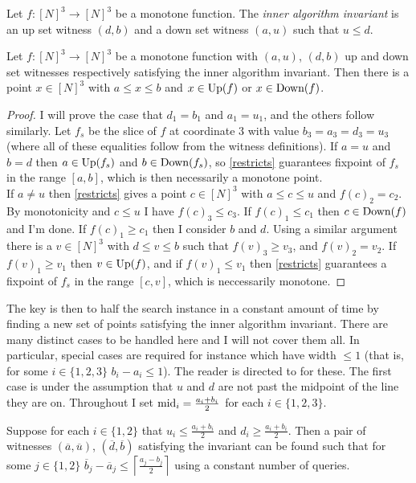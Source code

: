 \begin{definition}
  Let $f : [N]^3 \to [N]^3$ be a monotone function. The \emph{inner algorithm invariant}
  is an up set witness $(d, b)$ and a down set witness $(a, u)$ such that $u \leq d$.
\end{definition}
\begin{lemma}
  Let $f : [N]^3 \to [N]^3$ be a monotone function with $(a, u)$, $(d, b)$ up
  and down set witnesses respectively satisfying the inner algorithm invariant.
  Then there is a point $x \in [N]^3$ with $a \leq x \leq b$ and $x \in \text{Up}(f)$ or $x \in \text{Down}(f)$.
\end{lemma}
\begin{proof}
  I will prove the case that $d_1 = b_1$ and $a_1 = u_1$, and the others follow similarly.
  Let $f_s$ be the slice of $f$ at coordinate $3$ with value $b_3 = a_3 = d_3 = u_3$ (where all of
  these equalities follow from the witness definitions). If $a = u$ and $b = d$ then $a \in \text{Up}(f_s)$ and
  $b \in \text{Down}(f_s)$, so \cref{restricts} guarantees fixpoint of $f_s$ in the range $[a, b]$, which is then
  necessarily a monotone point. \\
  If $a \neq u$ then \cref{restricts} gives a point $c \in [N]^3$ with $a \leq c \leq u$ and $f(c)_2 = c_2$.
  By monotonicity and $c \leq u$ I have $f(c)_3 \leq c_3$. If $f(c)_1 \leq c_1$ then $c \in \text{Down}(f)$ and I'm done.
  If $f(c)_1 \geq c_1$ then I consider $b$ and $d$. Using a similar argument there is a $v \in [N]^3$ with $d \leq v \leq b$
  such that $f(v)_3 \geq v_3$, and $f(v)_2 = v_2$. If $f(v)_1 \geq v_1$ then $v \in \text{Up}(f)$, and if $f(v)_1 \leq v_1$
  then \cref{restricts} guarantees a fixpoint of $f_s$ in the range $[c, v]$, which is neccessarily monotone.
\end{proof}
The key is then to half the search instance in a constant amount of time by finding
a new set of points satisfying the inner algorithm invariant. There are many distinct cases
to be handled here and I will not cover them all. In particular, special cases are required for
instance which have width $\leq 1$ (that is, for some $i \in \{1, 2, 3\}$ $b_i - a_i \leq 1$). The 
reader is directed to \citep{fasterTarski} for these. The first case is under the assumption that $u$ and $d$ are
not past the midpoint of the line they are on.
Throughout I set $\text{mid}_i = \frac{a_i + b_i}{2}$ for each $i \in \{1, 2, 3\}$.
\begin{lemma}\label{innerMainCase}
  Suppose for each $i \in \{1, 2\}$ that $u_i \leq \frac{a_i + b_i}{2}$ and $d_i \geq \frac{a_i + b_i}{2}$.
  Then a pair of witnesses $(\overline{a}, \overline{u})$, $(\overline{d}, \overline{b})$ satisfying the invariant can be found
  such that for some $j \in \{1, 2\}$ $\overline{b}_j - \overline{a}_j \leq \left\lceil \frac{a_j - b_j}{2}\right \rceil$ using a constant
  number of queries. 
\end{lemma}
